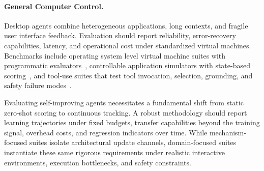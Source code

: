 \paragraph{General Computer Control.}
Desktop agents combine heterogeneous applications, long contexts, and fragile user interface feedback. Evaluation should report reliability, error-recovery capabilities, latency, and operational cost under standardized virtual machines. Benchmarks include operating system level virtual machine suites with programmatic evaluators~\citep{xie2024osworldbenchmarkingmultimodalagents, bonatti2024windowsagentarenaevaluating}, controllable application simulators with state-based scoring~\citep{trivedi2024appworldcontrollableworldapps}, and tool-use suites that test tool invocation, selection, grounding, and safety failure modes~\citep{patil2025the, huang2024metatoolbenchmarklargelanguage, ruan2024identifyingriskslmagents}.

\vspace{0.6em}
\begin{ttcolorbox}[Takeaway]
Evaluating self-improving agents necessitates a fundamental shift from static zero-shot scoring to continuous tracking.  A robust methodology should report learning trajectories under fixed budgets, transfer capabilities beyond the training signal, overhead costs, and regression indicators over time. While mechanism-focused suites isolate architectural update channels, domain-focused suites instantiate these same rigorous requirements under realistic interactive environments, execution bottlenecks, and safety constraints.
\end{ttcolorbox}
